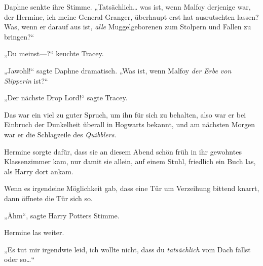 Daphne senkte ihre Stimme. „Tatsächlich… was ist, wenn Malfoy derjenige war, der Hermine, ich meine General Granger, überhaupt erst hat ausrutschten lassen? Was, wenn er darauf aus ist, \emph{alle} Muggelgeborenen zum Stolpern und Fallen zu bringen?“

„Du meinst—?“ keuchte Tracey.

„Jawohl!“ sagte Daphne dramatisch. „Was ist, wenn Malfoy \emph{der Erbe von} \emph{Slipperin} ist?“%

„Der nächste Drop Lord!“%
sagte Tracey.

Das war ein viel zu guter Spruch, um ihn für sich zu behalten, also war er bei Einbruch der Dunkelheit überall in Hogwarts bekannt, und am nächsten Morgen war er die Schlagzeile des \emph{Quibblers}.


Hermine sorgte dafür, dass sie an diesem Abend schön früh in ihr gewohntes Klassenzimmer kam, nur damit sie allein, auf einem Stuhl, friedlich ein Buch las, als Harry dort ankam.

Wenn es irgendeine Möglichkeit gab, dass eine Tür um Verzeihung bittend knarrt, dann öffnete die Tür sich so.

„Ähm“, sagte Harry Potters Stimme.

Hermine las weiter.

„Es tut mir irgendwie leid, ich wollte nicht, dass du \emph{tatsächlich} vom Dach fällst oder so…“

